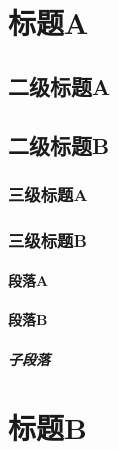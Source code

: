 
\begin{subappendices}

	\section{标题A}
	\subsection{二级标题A}
	\subsection{二级标题B}
	\subsubsection{三级标题A}
	\subsubsection{三级标题B}
	\paragraph{段落A}
	\paragraph{段落B}
	\subparagraph{子段落}
	\section{标题B}
\end{subappendices}